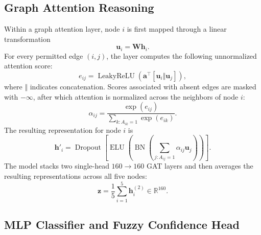 \documentclass[10pt,conference]{IEEEtran}
\begin{document}
\subsection{Graph Attention Reasoning}

Within a graph attention layer, node $i$ is first mapped through a linear transformation
\begin{equation}
\mathbf{u}_{i}=\mathbf{W}\mathbf{h}_{i}.
\end{equation}
For every permitted edge $(i,j)$, the layer computes the following unnormalized attention score:
\begin{equation}
e_{ij}=\operatorname{LeakyReLU}\left(
\mathbf{a}^{\top}[\mathbf{u}_{i}\Vert\mathbf{u}_{j}]
\right),
\end{equation}
where $\Vert$ indicates concatenation. Scores associated with absent edges are masked with $-\infty$, after which attention is normalized across the neighbors of node $i$:
\begin{equation}
\alpha_{ij}=\frac{\exp(e_{ij})}
{\sum_{k:A_{ik}=1}\exp(e_{ik})}.
\end{equation}
The resulting representation for node $i$ is
\begin{equation}
\mathbf{h}'_{i}=\operatorname{Dropout}\left[
\operatorname{ELU}\left(
\operatorname{BN}\left(
\sum_{j:A_{ij}=1}\alpha_{ij}\mathbf{u}_{j}
\right)\right)\right].
\end{equation}
The model stacks two single-head $160\rightarrow160$ GAT layers and then averages the resulting representations across all five nodes:
\begin{equation}
\mathbf{z}=\frac{1}{5}\sum_{i=1}^{5}\mathbf{h}_{i}^{(2)}
\in\mathbb{R}^{160}.
\end{equation}

\subsection{MLP Classifier and Fuzzy Confidence Head}
\end{document}
